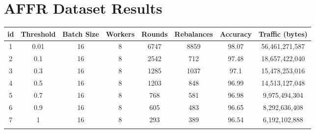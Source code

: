 \newpage


\section{AFFR Dataset Results}\label{sec:affr-dataset-results}

\begin{table}[H]
    \begin{tabular}{|c|c|c|c|c|c|c|c|}
        \hline
        \textbf{id}            & \textbf{Threshold}    & \textbf{Batch Size}   & \textbf{Workers}      & \textbf{Rounds}       & \textbf{Rebalances}   & \textbf{Accuracy}     & \textbf{Traffic (bytes)} \\
        \hline
        1                      & 0.01                  & 16                    & 8                     & 6747                  & 8859                  & 98.07                 & 56,461,271,587           \\
        2                      & 0.1                   & 16                    & 8                     & 2542                  & 712                   & 97.48                 & 18,657,422,040           \\
        3                      & 0.3                   & 16                    & 8                     & 1285                  & 1037                  & 97.1                  & 15,478,253,016           \\
        4                      & 0.5                   & 16                    & 8                     & 1203                  & 848                   & 96.99                 & 14,513,127,048           \\
        5                      & 0.7                   & 16                    & 8                     & 768                   & 581                   & 96.98                 & 9,975,494,304            \\
        6                      & 0.9                   & 16                    & 8                     & 605                   & 483                   & 96.65                 & 8,292,636,408            \\
        7                      & 1                     & 16                    & 8                     & 293                   & 389                   & 96.54                 & 6,192,102,888            \\
        \hline
        \multicolumn{1}{|l|}{} & \multicolumn{1}{l|}{} & \multicolumn{1}{l|}{} & \multicolumn{1}{l|}{} & \multicolumn{1}{l|}{} & \multicolumn{1}{l|}{} & \multicolumn{1}{l|}{} & \multicolumn{1}{l|}{}    \\

\end{tabular}
\end{table}
